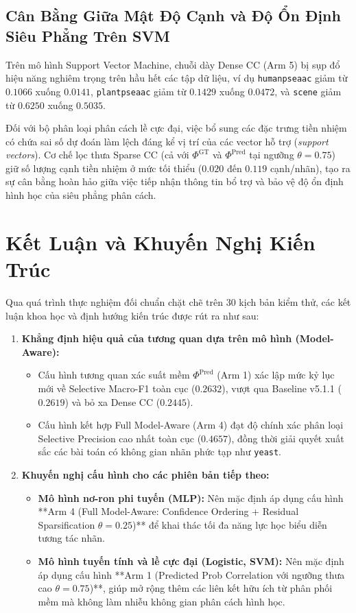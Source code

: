 \documentclass[11pt,a4paper]{article}
\begin{document}
\subsection{Cân Bằng Giữa Mật Độ Cạnh và Độ Ổn Định Siêu Phẳng Trên SVM}
Trên mô hình Support Vector Machine, chuỗi dày Dense CC (Arm 5) bị sụp đổ hiệu năng nghiêm trọng trên hầu hết các tập dữ liệu, ví dụ \texttt{humanpseaac} giảm từ $0.1066$ xuống $0.0141$, \texttt{plantpseaac} giảm từ $0.1429$ xuống $0.0472$, và \texttt{scene} giảm từ $0.6250$ xuống $0.5035$. 

Đối với bộ phân loại phân cách lề cực đại, việc bổ sung các đặc trưng tiền nhiệm có chứa sai số dự đoán làm lệch đáng kể vị trí của các vector hỗ trợ (\textit{support vectors}). Cơ chế lọc thưa Sparse CC (cả với $\Phi^{\text{GT}}$ và $\Phi^{\text{Pred}}$ tại ngưỡng $\theta = 0.75$) giữ số lượng cạnh tiền nhiệm ở mức tối thiểu ($0.020$ đến $0.119$ cạnh/nhãn), tạo ra sự cân bằng hoàn hảo giữa việc tiếp nhận thông tin bổ trợ và bảo vệ độ ổn định hình học của siêu phẳng phân cách.

\section{Kết Luận và Khuyến Nghị Kiến Trúc}

Qua quá trình thực nghiệm đối chuẩn chặt chẽ trên 30 kịch bản kiểm thử, các kết luận khoa học và định hướng kiến trúc được rút ra như sau:
\begin{enumerate}[leftmargin=*]
  \item \textbf{Khẳng định hiệu quả của tương quan dựa trên mô hình (Model-Aware):}
  \begin{itemize}
    \item Cấu hình tương quan xác suất mềm $\Phi^{\text{Pred}}$ (Arm 1) xác lập mức kỷ lục mới về Selective Macro-F1 toàn cục ($0.2632$), vượt qua Baseline v5.1.1 ($0.2619$) và bỏ xa Dense CC ($0.2445$).
    \item Cấu hình kết hợp Full Model-Aware (Arm 4) đạt độ chính xác phân loại Selective Precision cao nhất toàn cục ($0.4657$), đồng thời giải quyết xuất sắc các bài toán có không gian nhãn phức tạp như \texttt{yeast}.
  \end{itemize}
  \item \textbf{Khuyến nghị cấu hình cho các phiên bản tiếp theo:}
  \begin{itemize}
    \item \textbf{Mô hình nơ-ron phi tuyến (MLP):} Nên mặc định áp dụng cấu hình **Arm 4 (Full Model-Aware: Confidence Ordering + Residual Sparsification $\theta = 0.25$)** để khai thác tối đa năng lực học biểu diễn tương tác nhãn.
    \item \textbf{Mô hình tuyến tính và lề cực đại (Logistic, SVM):} Nên mặc định áp dụng cấu hình **Arm 1 (Predicted Prob Correlation với ngưỡng thưa cao $\theta = 0.75$)**, giúp mở rộng thêm các liên kết hữu ích từ phân phối mềm mà không làm nhiễu không gian phân cách hình học.
  \end{itemize}
\end{enumerate}
\end{document}
